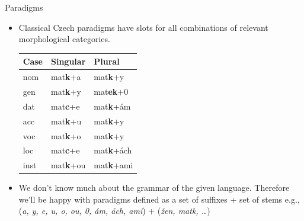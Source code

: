 \documentclass[hyperref={pdfencoding=unicode, unicode=true}, xcolor=dvipsnames]{beamer}
\begin{document}
\begin{frame}{Paradigms}

\begin{itemize}
\item Classical Czech paradigms have slots for all combinations of relevant morphological categories.

\begin{scriptsize}
\begin{center}
\begin{tabular}{lll}
\toprule \bf Case & \bf Singular & \bf Plural \\ \midrule
nom & mat\textbf{k}+a & mat\textbf{k}+y \\
gen & mat\textbf{k}+y & mat\textbf{ek}+0 \\
dat & mat\textbf{c}+e & mat\textbf{k}+ám\\
acc & mat\textbf{k}+u & mat\textbf{k}+y \\
voc & mat\textbf{k}+o & mat\textbf{k}+y \\
loc & mat\textbf{c}+e & mat\textbf{k}+ách \\
inst & mat\textbf{k}+ou & mat\textbf{k}+ami \\
\bottomrule
\end{tabular}
\end{center}
\end{scriptsize}

\item We don't know much about the grammar of the given language. Therefore we'll be happy with paradigms defined as a set of suffixes + set of stems e.g., (\emph{a, y, e, u, o, ou, 0, ám, ách, ami}) + (\emph{žen, matk, \ldots})

\end{itemize}
\end{frame}


%
\end{document}
